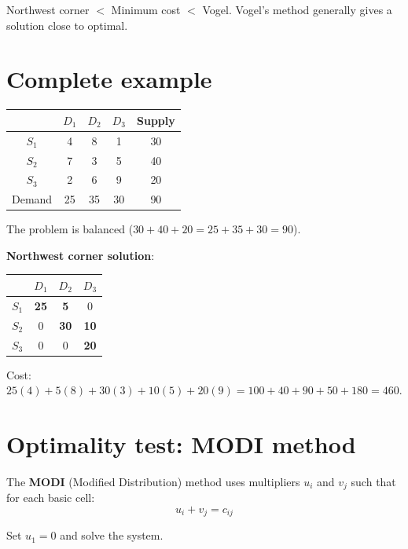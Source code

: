 \begin{bestpractice}[title=\textbf{Initial solution quality}]
Northwest corner $<$ Minimum cost $<$ Vogel.  Vogel's method generally
gives a solution close to optimal.
\end{bestpractice}

\section{Complete example}

\begin{example}
\begin{center}
\begin{tabular}{c|ccc|c}
  & $D_1$ & $D_2$ & $D_3$ & Supply \\
  \hline
  $S_1$ & 4 & 8 & 1 & 30 \\
  $S_2$ & 7 & 3 & 5 & 40 \\
  $S_3$ & 2 & 6 & 9 & 20 \\
  \hline
  Demand & 25 & 35 & 30 & 90 \\
\end{tabular}
\end{center}

The problem is balanced ($30 + 40 + 20 = 25 + 35 + 30 = 90$).

\textbf{Northwest corner solution}:
\begin{center}
\begin{tabular}{c|ccc}
  & $D_1$ & $D_2$ & $D_3$ \\
  \hline
  $S_1$ & \textbf{25} & \textbf{5} & 0 \\
  $S_2$ & 0 & \textbf{30} & \textbf{10} \\
  $S_3$ & 0 & 0 & \textbf{20} \\
\end{tabular}
\end{center}

Cost: $25(4) + 5(8) + 30(3) + 10(5) + 20(9) = 100 + 40 + 90 + 50 + 180
= 460$.
\end{example}

\section{Optimality test: MODI method}

The \textbf{MODI} (Modified Distribution) method uses multipliers $u_i$ and
$v_j$ such that for each basic cell:
\[
  u_i + v_j = c_{ij}
\]

Set $u_1 = 0$ and solve the system.

